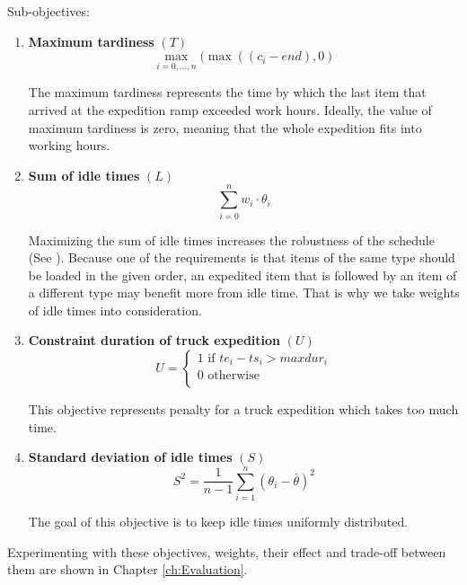 \documentclass{ctuthesis}
\begin{document}
Sub-objectives:

\begin{enumerate}
\item \textbf{Maximum tardiness} $(T)$\\ \begin{equation}\max_{i=0,\ldots,n}(\max((c_i - end), 0)\end{equation}

The maximum tardiness represents the time by which the last item that arrived at the expedition ramp exceeded work hours. Ideally, the value of maximum tardiness is zero, meaning that the whole expedition fits into working hours.

\item \textbf{Sum of idle times} $(L)$\\ 
\begin{equation}
    \sum_{i=0}^{n} w_i \cdot \theta_i
\end{equation}

Maximizing the sum of idle times increases the robustness of the schedule (See \cite{pinedo}). Because one of the requirements is that items of the same type should be loaded in the given order, an expedited item that is followed by an item of a different type may benefit more from idle time. That is why we take weights of idle times into consideration.

\item \textbf{Constraint duration of truck expedition} $(U)$
\begin{equation} 
   U = \begin{cases}
        1 \text{ if } te_i - ts_i > maxdur_i\\
        \text{0 otherwise}\\
       \end{cases}
\end{equation}

This objective represents penalty for a truck expedition which takes too much time.

\item \textbf{Standard deviation of idle times} $(S)$
\begin{equation} 
    S^2=\frac{1}{n-1}\sum_{i=1}^{n} (\theta_{i} -\bar{\theta})^2 
\end{equation}

The goal of this objective is to keep idle times uniformly distributed. 

\end{enumerate}
 
 Experimenting with these objectives, weights, their effect and trade-off between them are shown in Chapter \ref{ch:Evaluation}.
\end{document}

